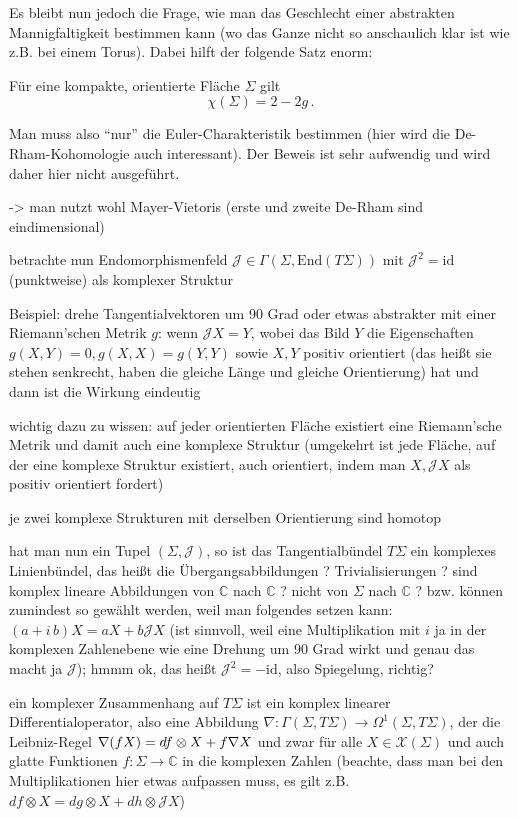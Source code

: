 Es bleibt nun jedoch die Frage, wie man das Geschlecht einer abstrakten Mannigfaltigkeit bestimmen kann (wo das Ganze nicht so anschaulich klar ist wie z.B. bei einem Torus). Dabei hilft der folgende Satz enorm:
\begin{satz}
Für eine kompakte, orientierte Fläche $\Sigma$ gilt
\begin{equation}
\chi(\Sigma) = 2 - 2g \, .
\end{equation}
\end{satz}
Man muss also \enquote{nur} die Euler-Charakteristik bestimmen (hier wird die De-Rham-Kohomologie auch interessant). Der Beweis ist sehr aufwendig und wird daher hier nicht ausgeführt.

-> man nutzt wohl Mayer-Vietoris (erste und zweite De-Rham sind eindimensional)


betrachte nun Endomorphismenfeld $\mathcal{J} \in \Gamma(\Sigma, \text{End}(T\Sigma))$ mit $\mathcal{J}^2 = \text{id}$ (punktweise) als komplexer Struktur


Beispiel: drehe Tangentialvektoren um 90 Grad oder etwas abstrakter mit einer Riemann'schen Metrik $g$: wenn $\mathcal{J}X = Y$, wobei das Bild $Y$ die Eigenschaften $g(X, Y) = 0, g(X, X) = g(Y, Y)$ sowie $X, Y$ positiv orientiert (das heißt sie stehen senkrecht, haben die gleiche Länge und gleiche Orientierung) hat und dann ist die Wirkung eindeutig

wichtig dazu zu wissen: auf jeder orientierten Fläche existiert eine Riemann'sche Metrik und damit auch eine komplexe Struktur (umgekehrt ist jede Fläche, auf der eine komplexe Struktur existiert, auch orientiert, indem man $X, \mathcal{J}X$ als positiv orientiert fordert)

je zwei komplexe Strukturen mit derselben Orientierung sind homotop 


hat man nun ein Tupel $(\Sigma, \mathcal{J})$, so ist das Tangentialbündel $T\Sigma$ ein komplexes Linienbündel, das heißt die Übergangsabbildungen ? Trivialisierungen ? sind komplex lineare Abbildungen von $\mathbb{C}$ nach $\mathbb{C}$ ? nicht von $\Sigma$ nach $\mathbb{C}$ ? bzw. können zumindest so gewählt werden, weil man folgendes setzen kann: $(a + i \, b) X = a X + b \mathcal{J} X$ (ist sinnvoll, weil eine Multiplikation mit $i$ ja in der komplexen Zahlenebene wie eine Drehung um 90 Grad wirkt und genau das macht ja $\mathcal{J}$); hmmm ok, das heißt $\mathcal{J}^2 = - \text{id}$, also Spiegelung, richtig?


ein komplexer Zusammenhang auf $T\Sigma$ ist ein komplex linearer Differentialoperator, also eine Abbildung $\nabla: \Gamma(\Sigma, T\Sigma) \rightarrow \Omega^1(\Sigma, T\Sigma)$, der die Leibniz-Regel $\nabla\qty(f X) = df \otimes X + f \nabla X$ und zwar für alle $X \in \mathcal{X}(\Sigma)$ und auch glatte Funktionen $f: \Sigma \rightarrow \mathbb{C}$ in die komplexen Zahlen (beachte, dass man bei den Multiplikationen hier etwas aufpassen muss, es gilt z.B. $df \otimes X = dg \otimes X + dh \otimes \mathcal{J} X$)


